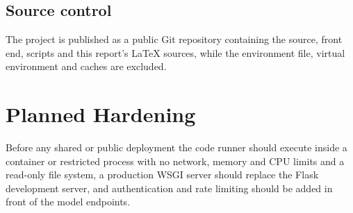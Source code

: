 \subsection{Source control}
The project is published as a public Git repository containing the source, front end, scripts and this report's LaTeX sources, while the environment file, virtual environment and caches are excluded.

\section{Planned Hardening}
\label{sec:future-hardening}
Before any shared or public deployment the code runner should execute inside a container or restricted process with no network, memory and CPU limits and a read-only file system, a production WSGI server should replace the Flask development server, and authentication and rate limiting should be added in front of the model endpoints.

